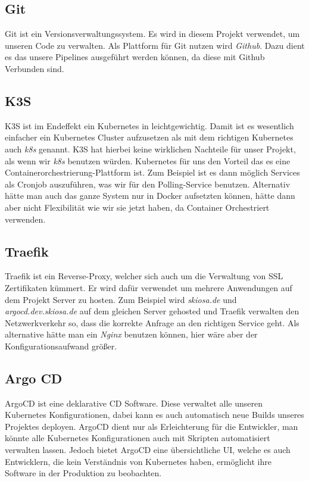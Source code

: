 \subsection{Git}
    Git ist ein Versionsverwaltungssystem. Es wird in diesem Projekt verwendet, um unseren Code zu verwalten. Als Plattform für Git nutzen wird \textit{Github}.
    Dazu dient es das unsere Pipelines ausgeführt werden können, da diese mit Github Verbunden sind.
\subsection{K3S}
    K3S ist im Endeffekt ein Kubernetes in leichtgewichtig. Damit ist es wesentlich einfacher ein Kubernetes Cluster aufzusetzen als mit dem richtigen Kubernetes auch \textit{k8s} genannt.
    K3S hat hierbei keine wirklichen Nachteile für unser Projekt, als wenn wir \textit{k8s} benutzen würden. Kubernetes für uns den Vorteil das es eine Containerorchestrierung-Plattform ist.
    Zum Beispiel ist es dann möglich Services als Cronjob auszuführen, was wir für den Polling-Service benutzen. Alternativ hätte man auch das ganze System nur in Docker aufsetzten können, hätte dann aber 
    nicht Flexibilität wie wir sie jetzt haben, da Container Orchestriert verwenden.
\subsection{Traefik}
    Traefik ist ein Reverse-Proxy, welcher sich auch um die Verwaltung von SSL Zertifikaten kümmert. Er wird dafür verwendet um mehrere Anwendungen auf dem Projekt Server zu hosten.
    Zum Beispiel wird \textit{skiosa.de} und \textit{argocd.dev.skiosa.de} auf dem gleichen Server gehosted und Traefik verwalten den Netzwerkverkehr so, dass die korrekte Anfrage an den richtigen Service geht.
    Als alternative hätte man ein \textit{Nginx} benutzen können, hier wäre aber der Konfigurationsaufwand größer.
\subsection{Argo CD}
    ArgoCD ist eine deklarative \ac{CD} Software. Diese verwaltet alle unseren Kubernetes Konfigurationen, dabei kann es auch automatisch neue Builds unseres Projektes deployen.
    ArgoCD dient nur als Erleichterung für die Entwickler, man könnte alle Kubernetes Konfigurationen auch mit Skripten automatisiert verwalten lassen. Jedoch bietet ArgoCD eine übersichtliche UI,
    welche es auch Entwicklern, die kein Verständnis von Kubernetes haben, ermöglicht ihre Software in der Produktion zu beobachten.
